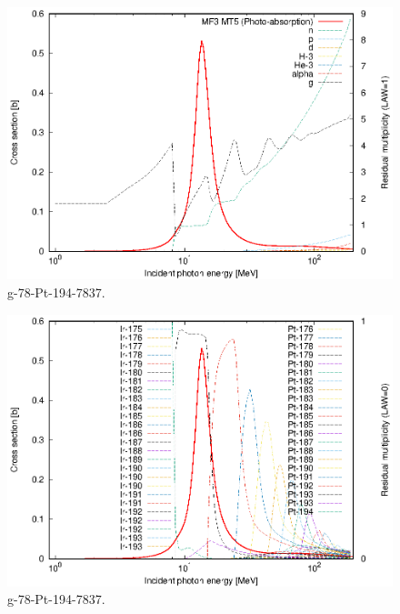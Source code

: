 \begin{figure}
 \includegraphics[width=\linewidth]{eps/g_78-Pt-194_7837.eps}
  \caption{g-78-Pt-194-7837.}
\end{figure}
\begin{figure}
 \includegraphics[width=\linewidth]{eps-law0/g_78-Pt-194_7837.eps}
 \caption{g-78-Pt-194-7837.}
\end{figure}
\newpage \clearpage

